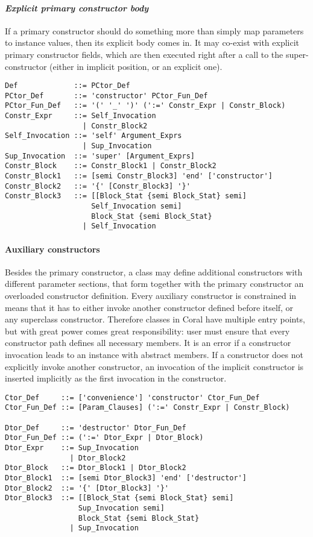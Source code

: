\paragraph{\em Explicit primary constructor body}
If a primary constructor should do something more than simply map parameters to instance values, then its explicit body comes in. It may co-exist with explicit primary constructor fields, which are then executed right after a call to the super-constructor (either in implicit position, or an explicit one). 
\syntax\begin{lstlisting}
Def             ::= PCtor_Def
PCtor_Def       ::= 'constructor' PCtor_Fun_Def
PCtor_Fun_Def   ::= '(' '_' ')' (':=' Constr_Expr | Constr_Block)
Constr_Expr     ::= Self_Invocation
                  | Constr_Block2
Self_Invocation ::= 'self' Argument_Exprs
                  | Sup_Invocation
Sup_Invocation  ::= 'super' [Argument_Exprs]
Constr_Block    ::= Constr_Block1 | Constr_Block2
Constr_Block1   ::= [semi Constr_Block3] 'end' ['constructor']
Constr_Block2   ::= '{' [Constr_Block3] '}'
Constr_Block3   ::= [[Block_Stat {semi Block_Stat} semi] 
                    Self_Invocation semi] 
                    Block_Stat {semi Block_Stat}
                  | Self_Invocation
\end{lstlisting}

\paragraph{Auxiliary constructors}
Besides the primary constructor, a class may define additional constructors with different parameter sections, that form together with the primary constructor an overloaded constructor definition. Every auxiliary constructor is constrained in means that it has to either invoke another constructor defined before itself, or any superclass constructor. Therefore classes in Coral have multiple entry points, but with great power comes great responsibility: user must ensure that every constructor path defines all necessary members. It is an error if a constructor invocation leads to an instance with abstract members. If a constructor does not explicitly invoke another constructor, an invocation of the implicit constructor is inserted implicitly as the first invocation in the constructor. 

\syntax\begin{lstlisting}
Ctor_Def     ::= ['convenience'] 'constructor' Ctor_Fun_Def
Ctor_Fun_Def ::= [Param_Clauses] (':=' Constr_Expr | Constr_Block)

Dtor_Def     ::= 'destructor' Dtor_Fun_Def
Dtor_Fun_Def ::= (':=' Dtor_Expr | Dtor_Block)
Dtor_Expr    ::= Sup_Invocation
               | Dtor_Block2
Dtor_Block   ::= Dtor_Block1 | Dtor_Block2
Dtor_Block1  ::= [semi Dtor_Block3] 'end' ['destructor']
Dtor_Block2  ::= '{' [Dtor_Block3] '}'
Dtor_Block3  ::= [[Block_Stat {semi Block_Stat} semi] 
                 Sup_Invocation semi] 
                 Block_Stat {semi Block_Stat}
               | Sup_Invocation
\end{lstlisting}


